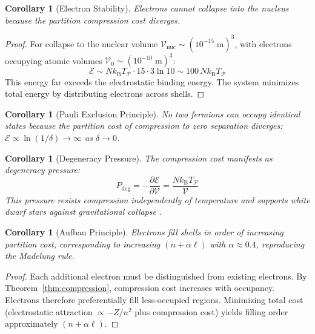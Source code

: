 \documentclass[twocolumn,10pt,a4paper]{article}
\theoremstyle{plain}
\newtheorem{corollary}[theorem]{Corollary}
\theoremstyle{definition}
\theoremstyle{remark}
\newcommand{\kB}{k_{\mathrm{B}}}
\newcommand{\Cost}{\mathcal{E}}
\newcommand{\Partition}{\mathcal{P}}
\begin{document}
\begin{corollary}[Electron Stability]
\label{cor:electron_stability}
Electrons cannot collapse into the nucleus because the partition compression cost diverges.
\end{corollary}

\begin{proof}
For collapse to the nuclear volume $\mathcal{V}_{\mathrm{nuc}} \sim (10^{-15}\;\mathrm{m})^3$, with electrons occupying atomic volumes $\mathcal{V}_0 \sim (10^{-10}\;\mathrm{m})^3$:
\begin{equation}
    \Cost \sim N \kB T_\Partition \cdot 15 \cdot 3\ln 10 \sim 100\, N \kB T_\Partition
\end{equation}
This energy far exceeds the electrostatic binding energy. The system minimizes total energy by distributing electrons across shells.
\end{proof}

\begin{corollary}[Pauli Exclusion Principle]
\label{cor:pauli}
No two fermions can occupy identical states because the partition cost of compression to zero separation diverges: $\Cost \propto \ln(1/\delta) \to \infty$ as $\delta \to 0$.
\end{corollary}

\begin{corollary}[Degeneracy Pressure]
\label{cor:degeneracy}
The compression cost manifests as degeneracy pressure:
\begin{equation}
    P_{\mathrm{deg}} = -\frac{\partial\Cost}{\partial\mathcal{V}} = \frac{N\kB T_\Partition}{\mathcal{V}}
\end{equation}
This pressure resists compression independently of temperature and supports white dwarf stars against gravitational collapse \cite{chandrasekhar1931}.
\end{corollary}

\begin{corollary}[Aufbau Principle]
\label{cor:aufbau}
Electrons fill shells in order of increasing partition cost, corresponding to increasing $(n + \alpha\ell)$ with $\alpha \approx 0.4$, reproducing the Madelung rule.
\end{corollary}

\begin{proof}
Each additional electron must be distinguished from existing electrons. By Theorem~\ref{thm:compression}, compression cost increases with occupancy. Electrons therefore preferentially fill less-occupied regions. Minimizing total cost (electrostatic attraction $\propto -Z/n^2$ plus compression cost) yields filling order approximately $(n + \alpha\ell)$.
\end{proof}
\end{document}
